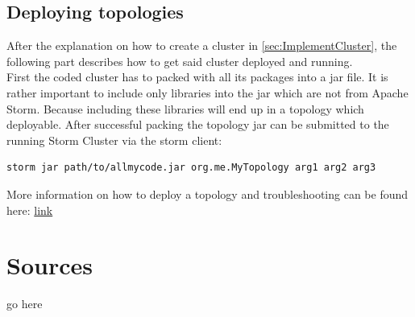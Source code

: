 \documentclass[12pt,a4paper]{article}
\begin{document}
\subsection{Deploying topologies}
After the explanation on how to create a cluster in \ref{sec:ImplementCluster}, the following part describes how to get said cluster deployed and running.\\
First the coded cluster has to packed with all its packages into a jar file. It is rather important to include only libraries into the jar which are not from Apache Storm. Because including these libraries will end up in a topology which deployable. After successful packing the topology jar can be submitted to the running Storm Cluster via the storm client:
\begin{verbatim}
storm jar path/to/allmycode.jar org.me.MyTopology arg1 arg2 arg3
\end{verbatim}
More information on how to deploy a topology and troubleshooting can be found here: \href{http://storm.apache.org/documentation/Running-topologies-on-a-production-cluster.html}{link}
\section{Sources}
go here
\end{document}
